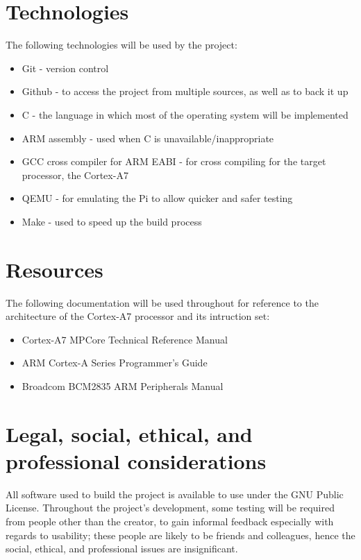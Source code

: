 \documentclass[10pt,a4paper]{article}
\begin{document}
\section*{Technologies}
The following technologies will be used by the project:
\begin{itemize}
    \item Git - version control
    \item Github - to access the project from multiple sources, as well as to
        back it up
    \item C - the language in which most of the operating system will be
        implemented
    \item ARM assembly - used when C is unavailable/inappropriate
        \cite{CannotDoC}
    \item GCC cross compiler for ARM EABI - for cross compiling for the target
        processor, the Cortex-A7 \cite{CrossCompilation}
    \item QEMU - for emulating the Pi to allow quicker and safer testing
        \cite{qemu}
    \item Make - used to speed up the build process
\end{itemize}

\section*{Resources}
The following documentation will be used throughout for reference to the
architecture of the Cortex-A7 processor and its intruction set:
        \begin{itemize}
            \item Cortex-A7 MPCore Technical Reference Manual
            \item ARM Cortex-A Series Programmer's Guide
            \item Broadcom BCM2835 ARM Peripherals Manual
        \end{itemize}

\section*{Legal, social, ethical, and professional  considerations}
All software used to build the project is available to use under the GNU Public
License. Throughout the project's development, some testing will be required
from people other than the creator, to gain informal feedback especially with
regards to usability; these people are likely to be friends and colleagues,
hence the social, ethical, and professional issues are insignificant.


\end{document}
